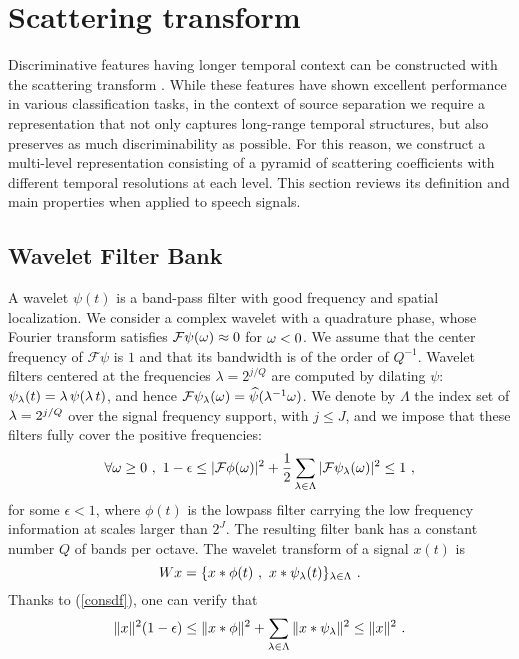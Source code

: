 \section{Scattering transform}
\label{scattsec}

Discriminative features having longer temporal context can be constructed with the 
scattering transform \cite{deepscatt,pami}. 
While these features have shown excellent performance in various classification tasks, 
in the context of source separation we require a representation that not only captures
long-range temporal structures, but also preserves as much discriminability as possible.
For this reason, we construct a multi-level representation consisting of a pyramid of scattering coefficients with different temporal resolutions at each level. 
This section reviews its definition and main properties when applied to speech signals.

\subsection{Wavelet Filter Bank}

A wavelet $\psi (t)$ is a band-pass filter with good frequency and spatial localization.
 We consider a complex wavelet with a quadrature phase, 
whose Fourier transform satisfies
$\mathcal{F} \psi({\omega}) \approx 0$ for ${\omega} < 0$.
We assume that the center frequency of $\mathcal{F} \psi$ is $1$ and 
that its bandwidth is of the order of $Q^{-1}$. 
Wavelet filters centered
at the frequencies $\lambda = 2^{j/Q}$ are computed by dilating $\psi$:
$\psi_{\lambda} (t) = {\lambda}\, \psi({\lambda}\, t)$, and hence $\mathcal{F} \psi_{\lambda} ({\omega}) = \widehat \psi({\lambda}^{-1} \omega)$.
We denote by $\Lambda$ the index set of ${\lambda} = 2^{j/Q}$ over
the signal frequency support, with $j \leq J$, 
and we impose that these filters fully cover the positive frequencies:
\begin{equation}
\label{consdf}
\forall {\omega} \geq 0~,~ 1- \epsilon 
\leq |\mathcal{F}{\phi}(\omega)|^2 + \frac 1 2 \sum_{{\lambda} \in \Lambda} |\mathcal{F}{\psi}_{\lambda}(\omega)|^2 \leq 1~,
\end{equation}
for some $\epsilon <1$, where $\phi(t)$ is the lowpass filter carrying the 
low frequency information at scales larger than $2^J$.
The resulting filter bank has a constant number $Q$ of bands per 
octave. The wavelet transform of a signal $x(t)$ is
\[
W x = \{x \ast \phi(t)~,~x \ast \psi_{\lambda}(t)  \}_{{\lambda} \in \Lambda}~.
\]
Thanks to (\ref{consdf}), one can verify that 
\begin{equation}
\label{lp_basic}
\| x \|^2 (1- \epsilon) \leq \| x \ast \phi \|^2 + \sum_{{\lambda} \in \Lambda} \| x \ast \psi_{\lambda} \|^2  \leq \| x \|^2~.
\end{equation}

